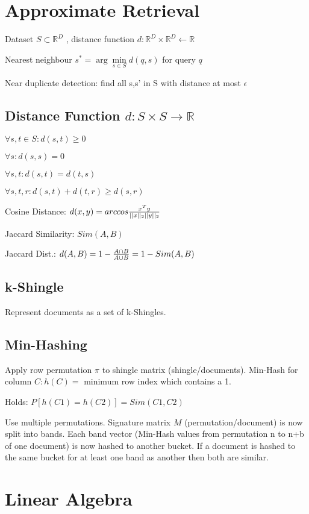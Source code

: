 \documentclass[a4paper,11pt,twocolumn]{article}
\author{Matthias Ganz}
\begin{document}
\section{Approximate Retrieval}
Dataset $S \subset \mathbb{R}^D$ , distance function $d: \mathbb{R}^D \times \mathbb{R}^D \leftarrow \mathbb{R}$

Nearest neighbour $s^* = \arg\min \limits_{s \in S} d(q,s) $ for query $q$

Near duplicate detection: find all s,s' in S with distance at most $\epsilon$

\subsection{Distance Function $d: S \times S  \rightarrow \mathbb{R}$}

$\forall s,t \in S : d(s,t) \geq 0$

$\forall s: d(s,s) = 0$

$\forall s,t:d(s,t) = d(t,s)$

$\forall s,t,r : d(s,t) + d(t,r) \geq d(s,r)$

Cosine Distance: $d(x,y) = arccos  {{x^T y}\over{ ||x||_2 ||y||_2}} $

Jaccard Similarity: $Sim(A,B)$

Jaccard Dist.: $d(A,B) = 1 - {{A \cap B}\over{A \cup B}} = 1 - Sim(A,B) $

\subsection{k-Shingle}
Represent documents as a set of k-Shingles.

\subsection{Min-Hashing}
Apply row permutation $\pi$ to shingle matrix (shingle/documents). Min-Hash for column $C: h(C) =$ minimum row index which contains a 1.

Holds: $P[h(C1) = h(C2)] = Sim (C1,C2)$

Use multiple permutations. Signature matrix $M$ (permutation/document) is now split into bands. Each band vector (Min-Hash values from permutation n to n+b of one document) is now hashed to another bucket. If a document is hashed to the same bucket for at least one band as another then both are similar.




\section{Linear Algebra}
\end{document}

